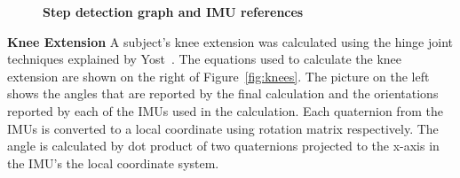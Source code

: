 \documentclass[conference]{IEEEtran}
\begin{document}
\begin{figure}[h]
  \centering
  \label{fig:swing}
  \caption{{\bf Step detection graph and IMU references}}
\end{figure}

{\bf Knee Extension} A subject's knee extension was calculated using the hinge joint
techniques explained by Yost~\cite{yost}. The equations used to calculate the knee
extension are shown on the right of Figure~\ref{fig:knees}. The picture on the left shows
the angles that are reported by the final calculation and the orientations reported by
each of the IMUs used in the calculation. Each quaternion from the IMUs is converted to a
local coordinate using rotation matrix respectively. The angle is calculated by dot
product of two quaternions projected to the x-axis in the IMU’s the local coordinate
system.
\end{document}
